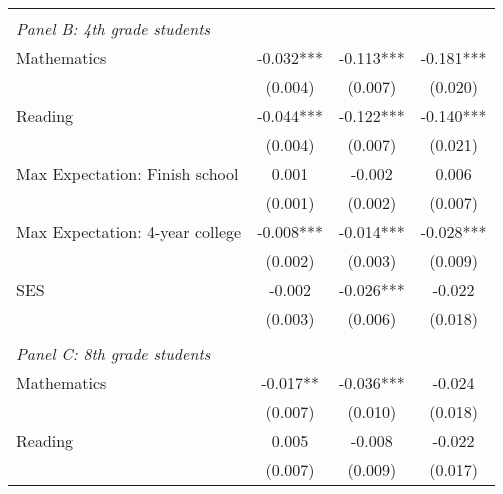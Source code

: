 {\begin{tabular}{lccc}
&  &  &   \\
\multicolumn{4}{l}{\textit{Panel B: 4th grade students}} \\
\hspace{3mm}Mathematics&      -0.032***&      -0.113***&      -0.181***\\
                    &     (0.004)   &     (0.007)   &     (0.020)   \\
 
\hspace{3mm}Reading &      -0.044***&      -0.122***&      -0.140***\\
                    &     (0.004)   &     (0.007)   &     (0.021)   \\
 
\hspace{3mm}Max Expectation: Finish school&       0.001   &      -0.002   &       0.006   \\
                    &     (0.001)   &     (0.002)   &     (0.007)   \\
 
\hspace{3mm}Max Expectation: 4-year college&      -0.008***&      -0.014***&      -0.028***\\
                    &     (0.002)   &     (0.003)   &     (0.009)   \\
 
\hspace{3mm}SES     &      -0.002   &      -0.026***&      -0.022   \\
                    &     (0.003)   &     (0.006)   &     (0.018)   \\
 
&  &  &   \\
\multicolumn{4}{l}{\textit{Panel C: 8th grade students}} \\
\hspace{3mm}Mathematics&      -0.017** &      -0.036***&      -0.024   \\
                    &     (0.007)   &     (0.010)   &     (0.018)   \\
 
\hspace{3mm}Reading &       0.005   &      -0.008   &      -0.022   \\
                    &     (0.007)   &     (0.009)   &     (0.017)   \\
 

\end{tabular}}
